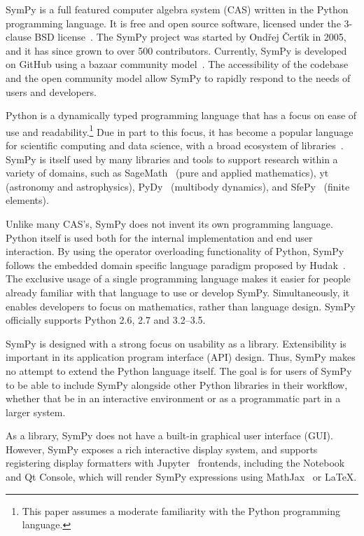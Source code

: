 SymPy is a full featured computer algebra system (CAS) written in the
Python~\cite{lutz2013learning}
programming language.
It is free and open source software, licensed under the 3-clause BSD
license~\cite{rosen2005open}.
The SymPy project was started by Ond\v{r}ej \v{C}ert\'{\i}k in 2005, and it has
since grown to over 500 contributors. Currently, SymPy is
developed on GitHub using a bazaar community
model~\cite{raymond1999cathedral}. The accessibility of the codebase and the
open community model allow SymPy to rapidly respond to the needs of
users and developers.

Python is a dynamically typed programming language that has a focus on
ease of use and readability.\footnote{This paper assumes a moderate
  familiarity with the Python programming language.} Due in part to this focus, it has become a popular
language for scientific
computing and data science, with a broad ecosystem of
libraries~\cite{oliphant2007python}. SymPy is itself used by many libraries
and tools to support research within a variety of domains, such as
SageMath~\cite{sagemath} (pure and applied mathematics),
yt~\cite{2011ApJS..192....9T} (astronomy and astrophysics),
PyDy~\cite{gede2013constrained} (multibody dynamics), and
SfePy~\cite{cimrman2014sfepy} (finite elements).

Unlike many CAS's, SymPy does not invent its own programming language. Python
itself is used both for the internal implementation and end user
interaction. By using the operator overloading functionality of Python, SymPy follows the embedded domain specific language paradigm proposed by Hudak~\cite{dsl-little-languages}.  The exclusive usage of a single programming language makes it easier
for people already familiar with that language to use or develop SymPy.
Simultaneously, it enables developers to focus on mathematics, rather than
language design.  SymPy officially supports Python 2.6, 2.7 and 3.2--3.5.

SymPy is designed with a strong focus on usability as a library.
Extensibility is important in its application program interface
(API) design. Thus, SymPy makes no attempt to extend
the Python language itself. The goal is for users of SymPy to be able to
include SymPy alongside other Python libraries in their workflow, whether that
be in an interactive environment or as a programmatic part in a larger system.

As a library, SymPy does not have a built-in graphical user interface (GUI).
However, SymPy exposes a rich interactive display system, and supports
registering display formatters with Jupyter~\cite{kluyver2016jupyter} frontends,
including the Notebook and Qt Console, which will render SymPy expressions
using MathJax~\cite{cervone2012mathjax} or \LaTeX{}.

